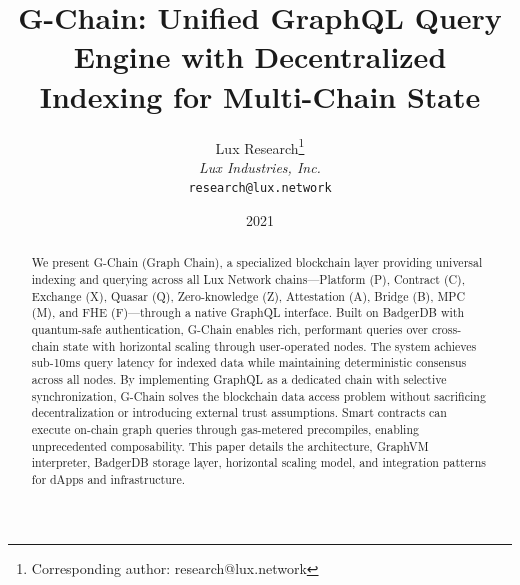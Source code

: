 \documentclass[11pt,a4paper]{article}
\title{G-Chain: Unified GraphQL Query Engine with Decentralized Indexing for Multi-Chain State}
\author{
Lux Research\thanks{Corresponding author: research@lux.network}\\
\textit{Lux Industries, Inc.}\\
\texttt{research@lux.network}
}
\date{2021}
\begin{document}
\luxcoverpage
\begin{abstract}
We present G-Chain (Graph Chain), a specialized blockchain layer providing universal indexing and querying across all Lux Network chains---Platform (P), Contract (C), Exchange (X), Quasar (Q), Zero-knowledge (Z), Attestation (A), Bridge (B), MPC (M), and FHE (F)---through a native GraphQL interface. Built on BadgerDB with quantum-safe authentication, G-Chain enables rich, performant queries over cross-chain state with horizontal scaling through user-operated nodes. The system achieves sub-10ms query latency for indexed data while maintaining deterministic consensus across all nodes. By implementing GraphQL as a dedicated chain with selective synchronization, G-Chain solves the blockchain data access problem without sacrificing decentralization or introducing external trust assumptions. Smart contracts can execute on-chain graph queries through gas-metered precompiles, enabling unprecedented composability. This paper details the architecture, GraphVM interpreter, BadgerDB storage layer, horizontal scaling model, and integration patterns for dApps and infrastructure.
\end{abstract}
















\end{document}
